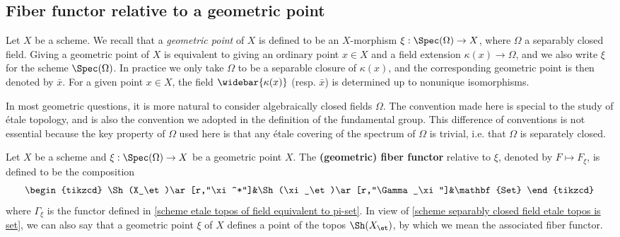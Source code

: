 \subsection{Fiber functor relative to a geometric point}
Let $X$ be a scheme. We recall that a \textit{geometric point} of $X$ is defined to be an $X$-morphism $\xi:\Spec(\Omega)\to X$, where $\Omega$ a separably closed field. Giving a geometric point of $X$ is equivalent to giving an ordinary point $x\in X$ and a field extension $\kappa(x)\to\Omega$, and we also write $\xi$ for the scheme $\Spec(\Omega)$. In practice we only take $\Omega$ to be a separable closure of $\kappa(x)$, and the corresponding geometric point is then denoted by $\bar{x}$. For a given point $x\in X$, the field $\widebar{\kappa(x)}$ (resp. $\bar{x}$) is determined up to nonunique isomorphisms.

\begin{remark}
In most geometric questions, it is more natural to consider algebraically closed fields $\Omega$. The convention made here is special to the study of \'etale topology, and is also the convention we adopted in the definition of the fundamental group. This difference of conventions is not essential because the key property of $\Omega$ used here is that any \'etale covering of the spectrum of $\Omega$ is trivial, i.e. that $\Omega$ is separately closed.
\end{remark}

\begin{definition}
Let $X$ be a scheme and $\xi:\Spec(\Omega)\to X$ be a geometric point $X$. The \textbf{(geometric) fiber functor} relative to $\xi$, denoted by $F\mapsto F_\xi$, is defined to be the composition
\[\begin{tikzcd}
\Sh(X_\et)\ar[r,"\xi^*"]&\Sh(\xi_\et)\ar[r,"\Gamma_\xi"]&\mathbf{Set}
\end{tikzcd}\]
where $\Gamma_\xi$ is the functor defined in \cref{scheme etale topos of field equivalent to pi-set}. In view of \cref{scheme separably closed field etale topos is set}, we can also say that a geometric point $\xi$ of $X$ defines a point of the topos $\Sh(X_\et)$, by which we mean the associated fiber functor.
\end{definition}

